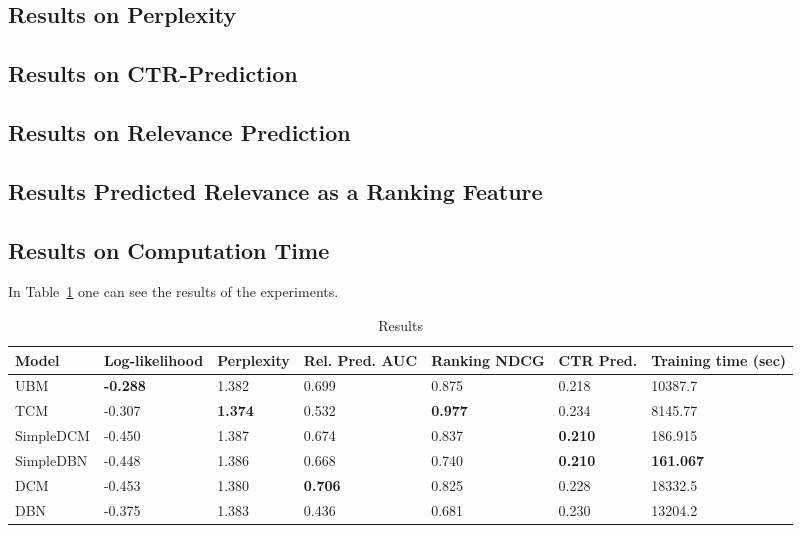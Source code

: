 \subsection{Results on Perplexity}

\subsection{Results on CTR-Prediction}

\subsection{Results on Relevance Prediction}

\subsection{Results Predicted Relevance as a Ranking Feature}

\subsection{Results on Computation Time}

In Table~\ref{table:results} one can see the results of the experiments.

\begin{table}[h]
	\begin{tabular}{@{}lllllll@{}}
		\toprule
		Model     & Log-likelihood  & Perplexity	 & Rel. Pred. AUC		 & Ranking NDCG      & CTR Pred.		 & Training time (sec) \\ \midrule
		UBM       & \textbf{-0.288} & 1.382          & 0.699                 & 0.875			 & 0.218			 & 10387.7                 \\
		TCM       & -0.307          & \textbf{1.374} & 0.532                 & \textbf{0.977}	 & 0.234			 & 8145.77                 \\
		SimpleDCM & -0.450          & 1.387          & 0.674                 & 0.837             & \textbf{0.210}	 & 186.915                 \\
		SimpleDBN & -0.448          & 1.386          & 0.668                 & 0.740             & \textbf{0.210}	 & \textbf{161.067}        \\
		DCM       & -0.453          & 1.380          & \textbf{0.706}        & 0.825			 & 0.228			 & 18332.5                 \\
		DBN       & -0.375          & 1.383          & 0.436                 & 0.681			 & 0.230			 & 13204.2                 \\ \bottomrule
	\end{tabular}
	\caption{Results}
	\label{table:results}
\end{table}
